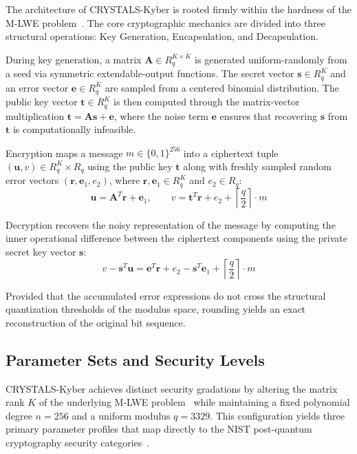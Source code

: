 The architecture of CRYSTALS-Kyber is rooted firmly within the hardness of the M-LWE problem~\cite{BosDKLLRSS18, kyber_spec_2021}. The core cryptographic mechanics are divided into three structural operations: Key Generation, Encapsulation, and Decapsulation.

During key generation, a matrix $\mathbf{A} \in R_q^{K \times K}$ is generated uniform-randomly from a seed via symmetric extendable-output functions. The secret vector $\mathbf{s} \in R_q^K$ and an error vector $\mathbf{e} \in R_q^K$ are sampled from a centered binomial distribution. The public key vector $\mathbf{t} \in R_q^K$ is then computed through the matrix-vector multiplication $\mathbf{t} = \mathbf{A}\mathbf{s} + \mathbf{e}$, where the noise term $\mathbf{e}$ ensures that recovering $\mathbf{s}$ from $\mathbf{t}$ is computationally infeasible.

Encryption maps a message $m \in \{0,1\}^{256}$ into a ciphertext tuple $(\mathbf{u}, v) \in R_q^K \times R_q$ using the public key $\mathbf{t}$ along with freshly sampled random error vectors $(\mathbf{r}, \mathbf{e}_1, e_2)$, where $\mathbf{r}, \mathbf{e}_1 \in R_q^K$ and $e_2 \in R_q$:
\begin{equation}
    \mathbf{u} = \mathbf{A}^T\mathbf{r} + \mathbf{e}_1, \qquad
    v = \mathbf{t}^T\mathbf{r} + e_2 + \left\lceil \frac{q}{2} \right\rceil \cdot m
\end{equation}

Decryption recovers the noisy representation of the message by computing the inner operational difference between the ciphertext components using the private secret key vector $\mathbf{s}$:
\begin{equation}
    v - \mathbf{s}^T\mathbf{u} = \mathbf{e}^T\mathbf{r} + e_2 - \mathbf{s}^T\mathbf{e}_1 + \left\lceil \frac{q}{2} \right\rceil \cdot m
\end{equation}

Provided that the accumulated error expressions do not cross the structural quantization thresholds of the modulus space, rounding yields an exact reconstruction of the original bit sequence.

\subsection{Parameter Sets and Security Levels}
\label{sub:parameter_sets_security}

CRYSTALS-Kyber achieves distinct security gradations by altering the matrix rank $K$ of the underlying M-LWE problem~\cite{langlois2015worst} while maintaining a fixed polynomial degree $n = 256$ and a uniform modulus $q = 3329$. This configuration yields three primary parameter profiles that map directly to the NIST post-quantum cryptography security categories~\cite{fips203}.

